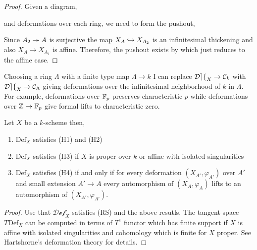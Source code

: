 \documentclass[12pt]{article}
\newcommand{\Def}{\mathrm{Def}}
\newcommand{\cDef}{\mathcal{Def}}
\begin{document}
\begin{proof}
Given a diagram,
\begin{center}
\end{center}
and deformations over each ring, we need to form the pushout,
\begin{center}
\end{center}
Since $A_2 \twoheadrightarrow A$ is surjective the map $X_A \hookrightarrow X_{A_2}$ is an infinitesimal thickening and also $X_{A} \to X_{A_1}$ is affine. Therefore, the pushout exists by  which just reduces to the affine case.
\end{proof}

\begin{rmk}
Choosing a ring $\Lambda$ with a finite type map $\Lambda \to k$ I can replace $\cDef_X \to \C_k$ with $\cDef_X \to \C_\Lambda$ giving deformations over the infinitesimal neighborhood of $k$ in $\Lambda$. For example, deformations over $\mathbb{F}_p$ preserves characteristic $p$ while deformations over $\mathbb{Z} \to \mathbb{F}_p$ give formal lifts to characteristic zero.
\end{rmk}

\begin{prop}
Let $X$ be a $k$-scheme then,
\begin{enumerate}
\item $\Def_X$ satisfies (H1) and (H2)
\item $\Def_X$ satisfies (H3) if $X$ is proper over $k$ or affine with isolated singularities
\item $\Def_X$ satisfies (H4) if and only if for every deformation $(X_{A'}, \varphi_{A'})$ over $A'$ and small extension $A' \to A$ every automorphism of $(X_A, \varphi_A)$ lifts to an automorphism of $(X_{A'}, \varphi_{A'})$.
\end{enumerate}
\end{prop}

\begin{proof}
Use that $\cDef_X$ satisfies (RS) and the above resutls. The tangent space $T \Def_X$ can be computed in terms of $T^1$ functor which has finite support if $X$ is affine with isolated singularities and cohomology which is finite for $X$ proper. See Hartshorne's deformation theory for details. 
\end{proof}
\end{document}
